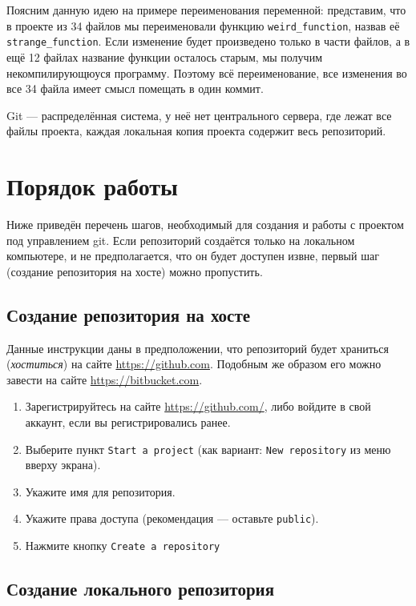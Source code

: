 \documentclass[12pt]{article}
\begin{document}
Поясним данную идею на примере переименования переменной:
представим, что в проекте из 34 файлов мы переименовали функцию
\verb!weird_function!, назвав её \verb!strange_function!.
Если изменение будет произведено только в части файлов, а в ещё
12 файлах название функции осталось старым, мы получим некомпилирующюуся
программу. Поэтому всё переименование, все изменения во все
34 файла имеет смысл помещать в один коммит. 

Git --- распределённая система, у неё нет центрального сервера, где
лежат все файлы проекта, каждая локальная копия проекта содержит
весь репозиторий. 

\section{Порядок работы}

Ниже приведён перечень шагов, необходимый для создания и работы
с проектом под управлением git. 
Если репозиторий создаётся только на локальном компьютере,
и не предполагается, что он будет доступен извне,
первый шаг (создание репозитория на хосте) можно пропустить.

\subsection{Создание репозитория на хосте}

Данные инструкции даны в предположении,
что репозиторий будет храниться (\emph{хоститься}) 
на сайте \url{https://github.com}.
Подобным же образом его можно завести на сайте 
\url{https://bitbucket.com}. 

\begin{enumerate}
\item Зарегистрируйтесь на сайте \url{https://github.com/},
либо войдите в свой аккаунт, если вы регистрировались ранее.

\item Выберите пункт \verb!Start a project! (как вариант:
\verb!New repository! из меню вверху экрана).

\item Укажите имя для репозитория.

\item Укажите права доступа (рекомендация --- оставьте \verb!public!).

\item Нажмите кнопку \verb!Create a repository!
\end{enumerate}

\subsection{Создание локального репозитория}
\end{document}
